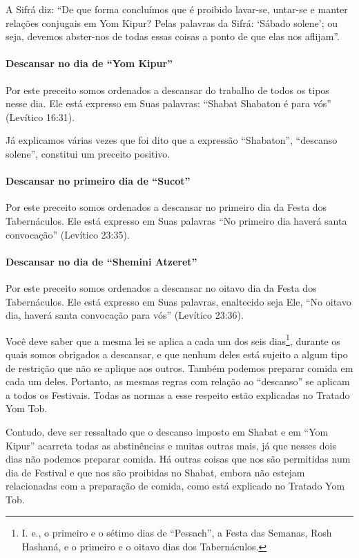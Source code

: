 A Sifrá diz: ``De que forma concluímos que é proibido lavar-se, untar-se
e manter relações conjugais em Yom Kipur? Pelas palavras da Sifrá:
`Sábado solene'; ou seja, devemos abster-nos de todas essas coisas a
ponto de que elas nos aflijam''.

\paragraph{Descansar no dia de ``Yom Kipur''}

Por este preceito somos ordenados a descansar do trabalho de todos os
tipos nesse dia. Ele está expresso em Suas palavras: ``Shabat Shabaton é
para vós'' (Levítico 16:31).

Já explicamos várias vezes que foi dito que a expressão ``Shabaton'',
``descanso solene'', constitui um preceito positivo.

\paragraph{Descansar no primeiro dia de ``Sucot''}

Por este preceito somos ordenados a descansar no primeiro dia da Festa
dos Tabernáculos. Ele está expresso em Suas palavras ``No primeiro dia
haverá santa convocação'' (Levítico 23:35).

\paragraph{Descansar no dia de ``Shemini Atzeret''}

Por este preceito somos ordenados a descansar no oitavo dia da Festa
dos Tabernáculos. Ele está expresso em Suas palavras, enaltecido seja
Ele, ``No oitavo dia, haverá santa convocação para vós'' (Levítico 23:36).

Você deve saber que a mesma lei se aplica a cada um dos seis
dias\footnote{I. e., o primeiro e o sétimo dias de ``Pessach'', a Festa das
Semanas, Rosh Hashaná, e o primeiro e o oitavo dias dos Tabernáculos.}, durante os quais somos obrigados a
descansar, e que nenhum deles está sujeito a algum tipo de restrição que não se aplique aos outros. Também podemos preparar comida em cada um deles. Portanto, as mesmas regras com relação ao ``descanso'' se aplicam a todos os Festivais. Todas as normas a esse
respeito estão explicadas no Tratado Yom Tob.

Contudo, deve ser ressaltado que o descanso imposto em Shabat e em ``Yom
Kipur'' acarreta todas as abstinências e muitas outras mais, já que
nesses dois dias não podemos preparar comida. Há outras coisas que nos
são permitidas num dia de Festival e que nos são proibidas no Shabat,
embora não estejam relacionadas com a preparação de comida, como está
explicado no Tratado Yom Tob.

